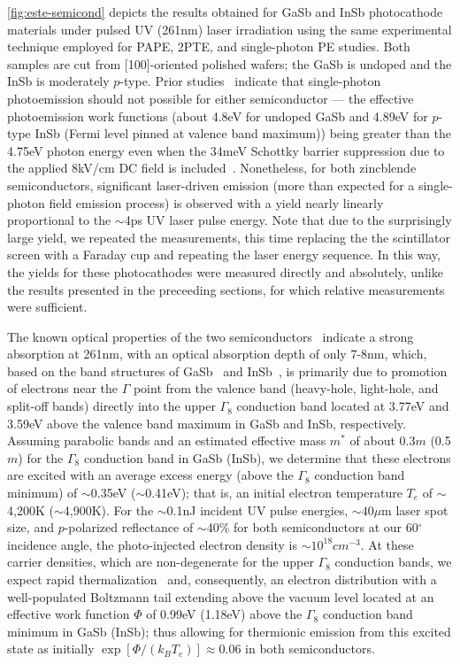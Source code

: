 \ref{fig:este-semicond} depicts the results obtained for GaSb and InSb photocathode materials under pulsed UV (261nm) laser irradiation using the same experimental technique employed for PAPE, 2PTE, and single-photon PE studies.
Both samples are cut from [100]-oriented polished wafers; the GaSb is undoped and the InSb is moderately $p$-type.
Prior studies~\cite{gobeli_photoelectric_1965} indicate that single-photon photoemission should not possible for either semiconductor --- the effective photoemission work functions (about 4.8eV for undoped GaSb and 4.89eV for $p$-type InSb (Fermi level pinned at valence band maximum)) being greater than the 4.75eV photon energy even when the 34meV Schottky barrier suppression due to the applied 8kV/cm DC field is included~\cite{dowell_quantum_2009}.
Nonetheless, for both zincblende semiconductors, significant laser-driven emission (more than expected for a single-photon field emission process) is observed with a yield nearly linearly proportional to the $\sim$4ps UV laser pulse energy.
Note that due to the surprisingly large yield, we repeated the measurements, this time replacing the the scintillator screen with a Faraday cup and repeating the laser energy sequence.
In this way, the yields for these photocathodes were measured directly and absolutely, unlike the results presented in the preceeding sections, for which relative measurements were sufficient.

The known optical properties of the two semiconductors~\cite{aspnes_dielectric_1983} indicate a strong absorption at 261nm, with an optical absorption depth of only 7-8nm, which, based on the band structures of GaSb~\cite{chelikowsky_nonlocal_1976} and InSb~\cite{chelikowsky_erratum_1984}, is primarily due to promotion of electrons near the $\Gamma$ point from the valence band (heavy-hole, light-hole, and split-off bands) directly into the upper $\Gamma_8$ conduction band located at 3.77eV and 3.59eV above the valence band maximum in GaSb and InSb, respectively.
Assuming parabolic bands and an estimated effective mass $m^*$ of about 0.3$m$ (0.5$m$) for the $\Gamma_8$ conduction band in GaSb (InSb), we determine that these electrons are excited with an average excess energy (above the $\Gamma_8$ conduction band minimum) of $\sim$0.35eV ($\sim$0.41eV); that is, an initial electron temperature $T_e$ of $\sim$4,200K ($\sim$4,900K).
For the $\sim$0.1nJ incident UV pulse energies, $\sim40\mu$m laser spot size, and $p$-polarized reflectance of $\sim$40\% for both semiconductors at our 60$^{\circ}$ incidence angle, the photo-injected electron density is $\sim10^{18}cm^{-3}$.
At these carrier densities, which are non-degenerate for the upper $\Gamma_8$ conduction bands, we expect rapid thermalization~\cite{portella_k-space_1992} and, consequently, an electron distribution with a well-populated Boltzmann tail extending above the vacuum level located at an effective work function $\Phi$ of 0.99eV (1.18eV) above the $\Gamma_8$ conduction band minimum in GaSb (InSb); thus allowing for thermionic emission from this excited state as initially $\exp[\Phi/(k_B T_e)] \approx 0.06$ in both semiconductors.  

